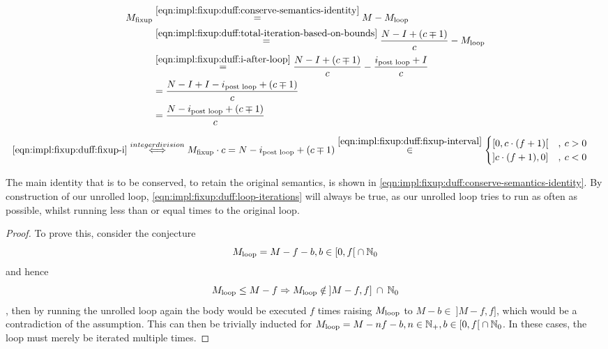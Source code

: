 \begin{equation}\label{eqn:impl:fixup:duff:fixup-i}
    \begin{aligned}
        M_{\text{fixup}} & \overset{\ref{eqn:impl:fixup:duff:conserve-semantics-identity}}{=} M - M_{\text{loop}} \\
        & \overset{\ref{eqn:impl:fixup:duff:total-iteration-based-on-bounds}}{=}
            \frac{N - I + (c \mp 1)}{c} - M_{\text{loop}} \\
        & \overset{\ref{eqn:impl:fixup:duff:i-after-loop}}{=}
        \frac{N - I + (c \mp 1)}{c} - \frac{i_\text{post loop} + I}{c} \\
        &= \frac{N - I + I - i_\text{post loop} + (c \mp 1)}{c}\\
        &= \frac{N - i_\text{post loop} + (c \mp 1)}{c}
    \end{aligned}
\end{equation}

\begin{equation}\label{eqn:impl:fixup:duff:fixup-i-mult}
    \begin{aligned}
        \ref{eqn:impl:fixup:duff:fixup-i} &\overset{integer division}{\Longleftrightarrow} M_{\text{fixup}} \cdot c = N - i_\text{post loop} + (c \mp 1) \overset{\ref{eqn:impl:fixup:duff:fixup-interval}}{\in}  \begin{cases} \lbrack 0, c \cdot (f + 1) \lbrack &, \medspace c > 0\\ \rbrack c \cdot (f + 1), 0 \rbrack &, \medspace c < 0 \end{cases} 
    \end{aligned}
\end{equation}

The main identity that is to be conserved, to retain the original semantics, is shown in \cref{eqn:impl:fixup:duff:conserve-semantics-identity}.
By construction of our unrolled loop, \cref{eqn:impl:fixup:duff:loop-iterations} will always be true, as our unrolled loop tries to run as often as possible, whilst running less than or equal times to the original loop.

\begin{proof}\label{proof:impl:fixup:duff:loop-iterations}
    To prove this, consider the conjecture
    \[M_{\text{loop}} = M - f - b,  b \in \lbrack 0, f \lbrack \medspace \cap \medspace \mathbb{N}_0\]
    and hence
    \[M_{\text{loop}} \leq M - f \Rightarrow M_{\text{loop}} \notin \medspace \rbrack M-f,f \rbrack \medspace \cap \medspace \mathbb{N}_0 \]
    , then by running the unrolled loop again the body would be executed $f$ times raising $M_{\text{loop}}$ to $M - b \in \medspace \rbrack M-f,f \rbrack$, which would be a contradiction of the assumption.
    This can then be trivially inducted for $M_{\text{loop}} = M - nf - b, n \in \mathbb{N}_{+}, b \in \lbrack 0, f \lbrack \medspace \cap \medspace \mathbb{N}_0$.
    In these cases, the loop must merely be iterated multiple times.
\end{proof}

